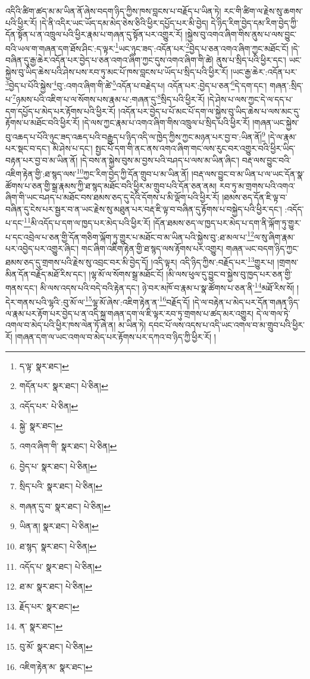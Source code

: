 འདིའི་ཚིག་ཚད་མ་མ་ཡིན་ནོ་ཞེས་བདག་ཉིད་ཀྱིས་ཁས་བླངས་པ་བརྗོད་པ་ཡིན་ཏེ། རང་གི་ཚིག་ལ་རྗེས་སུ་ཆགས་པའི་ཕྱིར་རོ། །དེ་ནི་འདིར་ཡང་ཡོད་དམ་མེད་ཅེས་ཅིའི་ཕྱིར་དཔྱོད་པར་མི་བྱེད། དེ་ཉིད་རིག་བྱེད་དམ་རིག་བྱེད་ཀྱི་དོན་སྟོན་པ་ན་འཁྲུལ་པའི་ཕྱིར་རྣམ་པ་གཞན་དུ་སྟོན་པར་འགྱུར་རོ། །སྐྱེས་བུ་འགའ་ཞིག་གིས་ནུས་པ་ལས་བྱུང་བའི་ཡལ་ག་གཞན་དག་ཐོས་ཤིང་:ད་ལྟར་\footnote{ད་ལྟ་  སྣར་ཐང་། }ཡང་ཉུང་ཟད་:འདོན་པར་\footnote{གདོན་པར་  སྣར་ཐང་།  པེ་ཅིན། }བྱེད་པ་ཅན་འགའ་ཞིག་ཀྱང་མཐོང་ངོ། །དེ་བཞིན་དུ་རྒྱ་ཆེར་འདོན་པར་བྱེད་པ་ཅན་འགའ་ཞིག་ཀྱང་དུས་འགའ་ཞིག་གི་ཚེ། ནུས་པ་སྲིད་པའི་ཕྱིར་དང་། ཡང་སྐྱེས་བུ་ཡིད་ཆེས་པའི་ཤེས་པས་རབ་ཏུ་མང་པོ་ཁས་བླངས་པ་ཡོད་པ་སྲིད་པའི་ཕྱིར་རོ། །ཡང་རྒྱ་ཆེར་:འདོན་པར་\footnote{འདོད་པར་  པེ་ཅིན། }བྱེད་པ་པོའི་སྐྱེས་\footnote{སྐྱེ་  སྣར་ཐང་། }བུ་:འགའ་ཞིག་གི་ཚེ་\footnote{འགའ་ཞིག་གི་  སྣར་ཐང་།  པེ་ཅིན། }འདོན་པ་བརྗེད་པ། འདོན་པར་:བྱེད་པ་ཅན་\footnote{བྱེད་པ་  སྣར་ཐང་།  པེ་ཅིན། }དེ་དག་དང་། གཞན་:སྲིད་པ་\footnote{སྲིད་པའི་  སྣར་ཐང་།  པེ་ཅིན། }ཉམས་པའི་འཇིག་པ་ལ་སོགས་པས་རྣམ་པ་:གཞན་དུ་\footnote{གཞན་དུ་བ་  སྣར་ཐང་།  པེ་ཅིན། }སྲིད་པའི་ཕྱིར་རོ། །དེ་ཤེས་པ་ལས་ཀྱང་དེ་ལ་དད་པ་དག་དཔྱོད་པ་མེད་པར་རྟོགས་པའི་ཕྱིར་རོ། །འདོན་པར་བྱེད་པ་པོ་མང་པོ་དག་ལ་སྐྱེས་བུ་ཡིད་ཆེས་པ་ལས་མང་དུ་རྟོགས་པ་མཐོང་བའི་ཕྱིར་རོ། །དེ་ལས་ཀྱང་རྣམ་པ་འགའ་ཞིག་གིས་འཁྲུལ་པ་སྲིད་པའི་ཕྱིར་རོ། །གཞན་ཡང་སྐྱེས་བུ་འཆད་པ་པོའི་ཉུང་ཟད་འཆད་པའི་བརྒྱུད་པ་ཉིད་འདི་ལ་ཁྱེད་ཀྱིས་ཀྱང་མཉན་པར་བྱ་བ་:ཡིན་ནོ།\footnote{ཡིན་ན།  སྣར་ཐང་།  པེ་ཅིན། } །དེ་ལ་རྣམ་པར་སྡང་བ་དང་། མི་ཤེས་པ་དང་། སྤྱང་པོ་དག་གི་ནང་ནས་འགའ་ཞིག་གང་ལས་རུང་བར་འགྱུར་བའི་ཕྱིར་ཡིད་བརྟན་པར་བྱ་བ་མ་ཡིན་ནོ། །དེ་བས་ན་སྐྱེས་བུས་མ་བྱས་པའི་བཤད་པ་ལས་མ་ཡིན་ཞིང་། བརྡ་ལས་བྱུང་བའི་འཇིག་རྟེན་གྱི་:ཐ་སྙད་ལས་\footnote{ཐ་སྙད་  སྣར་ཐང་།  པེ་ཅིན། }ཀྱང་རིག་བྱེད་ཀྱི་དོན་གྲུབ་པ་མ་ཡིན་ནོ། །བརྡ་ལས་བྱུང་བ་མ་ཡིན་པ་ལ་ཡང་དོན་སྣ་ཚོགས་པ་ཅན་གྱི་སྒྲ་རྣམས་ཀྱི་ཐ་སྙད་མཐོང་བའི་ཕྱིར་མ་གྲུབ་པའི་དོན་ཅན་ནམ། རབ་ཏུ་མ་གྲགས་པའི་འགའ་ཞིག་གི་ཡང་བཤད་པ་མཐོང་བས་ཐམས་ཅད་དུ་དེའི་དོགས་པ་མི་ལྡོག་པའི་ཕྱིར་རོ། །ཐམས་ཅད་དོན་ཇི་ལྟ་བ་བཞིན་དུ་ངེས་པར་སྦྱར་བ་ན་ཡང་རྗེས་སུ་མཐུན་པར་བརྡ་ཇི་ལྟ་བ་བཞིན་དུ་རྟོགས་པ་བསྐྱེད་པའི་ཕྱིར་དང་། :འདོད་པ་དང་\footnote{འདོད་པ་  སྣར་ཐང་།  པེ་ཅིན། }མི་འདོད་པ་དག་ལ་ཁྱད་པར་མེད་པའི་ཕྱིར་རོ། །དོན་ཐམས་ཅད་ལ་ཁྱད་པར་མེད་པ་དག་ནི་ལྐོག་ཏུ་གྱུར་པ་དང་འབྲེལ་པ་ཅན་གྱི་དོན་གཅིག་ལྐོག་ཏུ་གྱུར་པ་མཐོང་བ་མ་ཡིན་པའི་སྐྱེས་བུ་:ཐ་མལ་པ་\footnote{ཐ་མ་  སྣར་ཐང་།  པེ་ཅིན། }ལ་སུ་ཞིག་རྣམ་པར་འབྱེད་པར་འགྱུར་ཞིང་། གང་ཞིག་འཇིག་རྟེན་གྱི་ཐ་སྙད་ལས་རྟོགས་པར་འགྱུར། གཞན་ཡང་བདག་ཉིད་ཀྱང་ཐམས་ཅད་དུ་གྲགས་པའི་རྗེས་སུ་འབྲང་བར་མི་བྱེད་དོ། །འདི་ལྟར། འདི་ཉིད་ཀྱིས་:བརྗོད་པར་\footnote{རྗོད་པར་  སྣར་ཐང་། }གྱུར་པ། །གྲགས་མིན་དོན་བརྗོད་མཐོ་རིས་དང་། །ལྷ་མོ་ལ་སོགས་སྒྲ་མཐོང་ངོ། །མི་ལས་ཕུལ་དུ་བྱུང་བ་སྐྱེས་བུ་ཁྱད་པར་ཅན་གྱི་གནས་དང་། མི་ལས་འདས་པའི་བདེ་བའི་རྟེན་དང་། ཉེ་བར་མཁོ་བ་རྣམ་པ་སྣ་ཚོགས་པ་ཅན་ནི་\footnote{ན་  སྣར་ཐང་། }མཐོ་རིས་སོ། །དེར་གནས་པའི་ལྷའི་:བུ་མོ་ལ་\footnote{བུ་མོ་  སྣར་ཐང་།  པེ་ཅིན། }ལྷ་མོ་ཞེས་:འཇིག་རྟེན་ན་\footnote{འཇིག་རྟེན་མ་  སྣར་ཐང་། }བརྗོད་དོ། །དེ་ལ་བརྟེན་པ་མེད་པར་དོན་གཞན་ཉིད་ལ་རྣམ་པར་རྟོག་པར་བྱེད་པ་ན་འདི་སྐྲ་གཞན་དག་ལ་ཇི་ལྟར་རབ་ཏུ་གྲགས་པ་ཚད་མར་འགྱུར། དེ་ལ་གལ་ཏེ་འགལ་བ་མེད་པའི་ཕྱིར་ཁས་ལེན་ཏོ་ཞེ་ན། མ་ཡིན་ཏེ། དབང་པོ་ལས་འདས་པ་འདི་ཡང་འགལ་བ་མ་གྲུབ་པའི་ཕྱིར་རོ། །གཞན་དག་ལ་ཡང་འགལ་བ་མེད་པར་རྟོགས་པར་དཀའ་བ་ཉིད་ཀྱི་ཕྱིར་རོ། །
